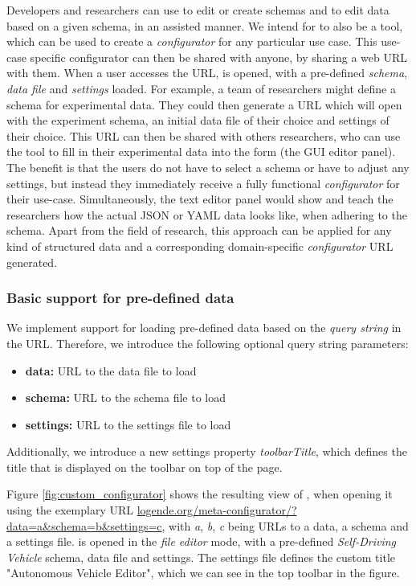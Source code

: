 Developers and researchers can use \toolname{} to edit or create schemas and to edit data based on a given schema, in an assisted manner.
We intend for \toolname{} to also be a tool, which can be used to create a \textit{configurator} for any particular use case.
This use-case specific configurator can then be shared with anyone, by sharing a web URL with them.
When a user accesses the URL, \toolname{} is opened, with a pre-defined \textit{schema}, \textit{data file} and \textit{settings} loaded.
For example, a team of researchers might define a schema for experimental data. 
They could then generate a URL which will open \toolname{} with the experiment schema, an initial data file of their choice and settings of their choice.
This URL can then be shared with others researchers, who can use the tool to fill in their experimental data into the form (the GUI editor panel).
The benefit is that the users do not have to select a schema or have to adjust any settings, but instead they immediately receive a fully functional \textit{configurator} for their use-case.
Simultaneously, the text editor panel would show and teach the researchers how the actual JSON or YAML data looks like, when adhering to the schema.
Apart from the field of research, this approach can be applied for any kind of structured data and a corresponding domain-specific \textit{configurator} URL generated.

\subsubsection{Basic support for pre-defined data}\label{subsubsec:custom_configurator_basic}
We implement support for loading pre-defined data based on the \textit{query string} in the URL.
Therefore, we introduce the following optional query string parameters:
\begin{itemize}
	\item \textbf{data:} URL to the data file to load
	\item \textbf{schema:} URL to the schema file to load
	\item \textbf{settings:} URL to the settings file to load
\end{itemize}

Additionally, we introduce a new settings property \textit{toolbarTitle}, which defines the title that is displayed on the \toolname{} toolbar on top of the page.

Figure \ref{fig:custom_configurator} shows the resulting view of \toolname{}, when opening it using the exemplary URL \underline{logende.org/meta-configurator/?data=a\&schema=b\&settings=c}, with \textit{a}, \textit{b}, \textit{c} being URLs to a data, a schema and a settings file.
\toolname{} is opened in the \textit{file editor} mode, with a pre-defined \textit{Self-Driving Vehicle} schema, data file and settings.
The settings file defines the custom title "Autonomous Vehicle Editor", which we can see in the top toolbar in the figure.


